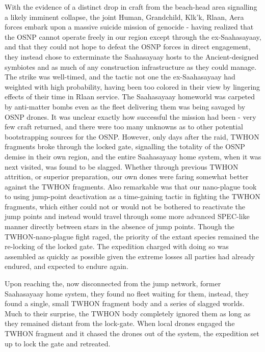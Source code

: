 With the evidence of a distinct drop in craft from the beach-head area
signalling a likely imminent collapse, the joint Human, Grandchild,
Klk'k, Rlaan, Aera forces embark upon a massive suicide mission of
genocide - having realized that the OSNP cannot operate freely in our
region except through the ex-Saahasayaay, and that they could not hope
to defeat the OSNP forces in direct engagement, they instead chose to
exterminate the Saahasayaay hosts to the Ancient-designed symbiotes
and as much of any construction infrastructure as they could
manage. The strike was well-timed, and the tactic not one the
ex-Saahasayaay had weighted with high probability, having been too
colored in their view by lingering effects of their time in Rlaan
service. The Saahasayaay homeworld was carpeted by anti-matter bombs
even as the fleet delivering them was being savaged by OSNP drones. It
was unclear exactly how successful the mission had been - very few
craft returned, and there were too many unknowns as to other potential
bootstrapping sources for the OSNP. However, only days after the raid,
TWHON fragments broke through the locked gate, signalling the totality
of the OSNP demise in their own region, and the entire Saahasayaay
home system, when it was next visited, was found to be
slagged. Whether through previous TWHON attrition, or superior
preparation, our own dones were faring somewhat better against the
TWHON fragments. Also remarkable was that our nano-plague took to
using jump-point deactivation as a time-gaining tactic in fighting the
TWHON fragments, which either could not or would not be bothered to
reactivate the jump points and instead would travel through some more
advanced SPEC-like manner directly between stars in the absence of
jump points. Though the TWHON-nano-plague fight raged, the priority of
the extant species remained the re-locking of the locked gate. The
expedition charged with doing so was assembled as quickly as possible
given the extreme losses all parties had already endured, and expected
to endure again.

Upon reaching the, now disconnected from the jump network, former
Saahasayaay home system, they found no fleet waiting for them,
instead, they found a single, small TWHON fragment body and a series
of slagged worlds. Much to their surprise, the TWHON body completely
ignored them as long as they remained distant from the lock-gate. When
local drones engaged the TWHON fragment and it chased the drones out
of the system, the expedition set up to lock the gate and retreated.

